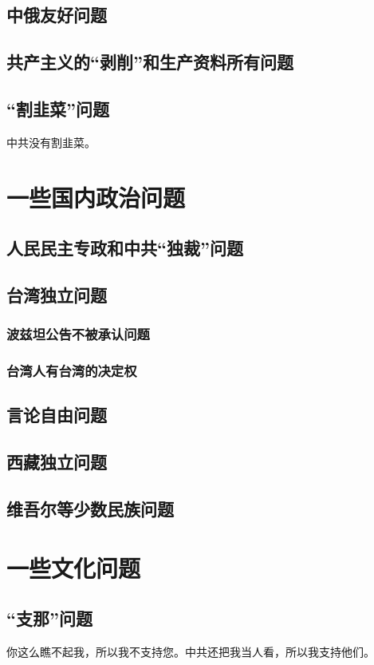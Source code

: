 \documentclass[UTF8,a4paper]{ctexart}
\begin{document}
\subsection{中俄友好问题}
\subsection{共产主义的“剥削”和生产资料所有问题}
\subsection{“割韭菜”问题}
中共没有割韭菜。

\section{一些国内政治问题}
\subsection{人民民主专政和中共“独裁”问题}
\subsection{台湾独立问题}
\subsubsection{波兹坦公告不被承认问题}
\subsubsection{台湾人有台湾的决定权}
\subsection{言论自由问题}
\subsection{西藏独立问题}
\subsection{维吾尔等少数民族问题}

\section{一些文化问题}
\subsection{“支那”问题}
你这么瞧不起我，所以我不支持您。中共还把我当人看，所以我支持他们。
\end{document}

